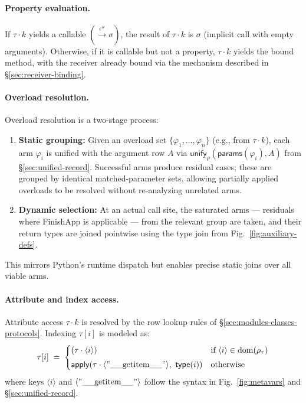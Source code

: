 \paragraph{Property evaluation.}
If $\tau \cdot k$ yields a callable $(\xrightarrow{\epsilon^\#} \sigma)$, 
the result of $\tau \cdot k$ is $\sigma$ (implicit call with empty arguments).  
Otherwise, if it is callable but not a property, $\tau \cdot k$ yields the bound method, with the receiver already bound via the mechanism described in \S\ref{sec:receiver-binding}.

\paragraph{Overload resolution.}
\label{sec:overload-resolution}
Overload resolution is a two-stage process:
\begin{enumerate}
\item \textbf{Static grouping:}  
  Given an overload set $\{\varphi_1, \ldots, \varphi_n\}$ (e.g., from $\tau \cdot k$), each arm $\varphi_i$ is unified with the argument row $A$ via  
  $\mathsf{unify}_{\rho}(\mathsf{params}(\varphi_i), A)$ from \S\ref{sec:unified-record}.  
  Successful arms produce residual cases; these are grouped by identical matched-parameter sets, allowing partially applied overloads to be resolved without re-analyzing unrelated arms.
\item \textbf{Dynamic selection:}  
  At an actual call site, the saturated arms --- residuals where \textsf{FinishApp} is applicable --- from the relevant group are taken, and their return types are joined pointwise using the type join from Fig.~\ref{fig:auxiliary-defs}.
\end{enumerate}
This mirrors Python’s runtime dispatch but enables precise static joins over all viable arms.

\paragraph{Attribute and index access.}  
\label{sec:rows-generic-access}
Attribute access $\tau \cdot k$ is resolved by the row lookup rules of \S\ref{sec:modules-classes-protocols}.  
Indexing $\tau[i]$ is modeled as:
\[
\tau[i] \;=\;
\begin{cases}
(\tau \cdot \langle i\rangle) & \text{if $\langle i\rangle \in \mathrm{dom}(\rho_\tau)$} \\[0.3em]
\mathsf{apply}(\tau \cdot \langle \mathrm{"\_\_getitem\_\_"}\rangle,\ \mathsf{type}(i)) & \text{otherwise}
\end{cases}
\]
where keys $\langle i\rangle$ and $\langle \mathrm{"\_\_getitem\_\_"}\rangle$ follow the syntax in Fig.~\ref{fig:metavars} and \S\ref{sec:unified-record}.

